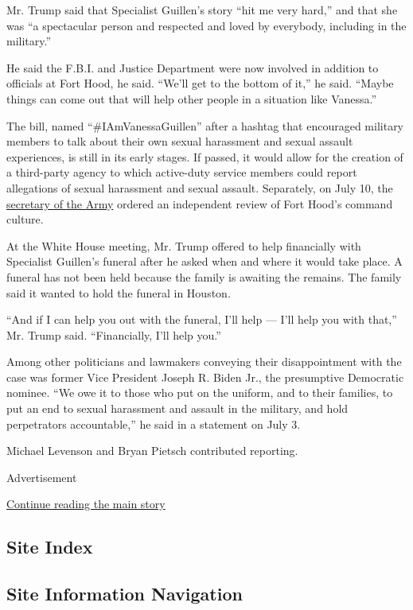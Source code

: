 Mr. Trump said that Specialist Guillen's story ``hit me very hard,'' and
that she was ``a spectacular person and respected and loved by
everybody, including in the military.''

He said the F.B.I. and Justice Department were now involved in addition
to officials at Fort Hood, he said. ``We'll get to the bottom of it,''
he said. ``Maybe things can come out that will help other people in a
situation like Vanessa.''

The bill, named ``\#IAmVanessaGuillen'' after a hashtag that encouraged
military members to talk about their own sexual harassment and sexual
assault experiences, is still in its early stages. If passed, it would
allow for the creation of a third-party agency to which active-duty
service members could report allegations of sexual harassment and sexual
assault. Separately, on July 10, the
\href{https://twitter.com/SecArmy/status/1281641910327824386?s=20}{secretary
of the Army} ordered an independent review of Fort Hood's command
culture.

At the White House meeting, Mr. Trump offered to help financially with
Specialist Guillen's funeral after he asked when and where it would take
place. A funeral has not been held because the family is awaiting the
remains. The family said it wanted to hold the funeral in Houston.

``And if I can help you out with the funeral, I'll help --- I'll help
you with that,'' Mr. Trump said. ``Financially, I'll help you.''

Among other politicians and lawmakers conveying their disappointment
with the case was former Vice President Joseph R. Biden Jr., the
presumptive Democratic nominee. ``We owe it to those who put on the
uniform, and to their families, to put an end to sexual harassment and
assault in the military, and hold perpetrators accountable,'' he said in
a statement on July 3.

Michael Levenson and Bryan Pietsch contributed reporting.

Advertisement

\protect\hyperlink{after-bottom}{Continue reading the main story}

\hypertarget{site-index}{%
\subsection{Site Index}\label{site-index}}

\hypertarget{site-information-navigation}{%
\subsection{Site Information
Navigation}\label{site-information-navigation}}

